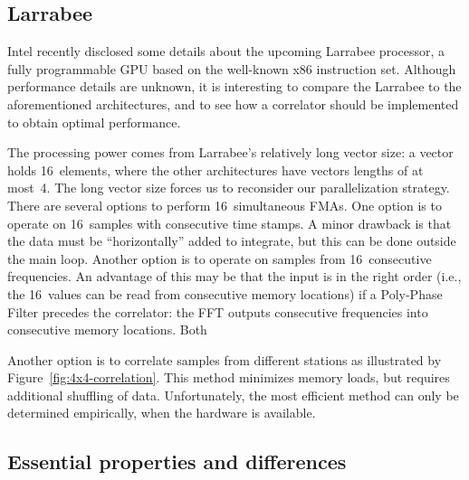 \documentclass{article}
\begin{document}
\subsection{Larrabee}

Intel recently disclosed some details about the upcoming Larrabee processor,
a fully programmable GPU based on the well-known x86 instruction set.
Although performance details are unknown, it is interesting to compare the
Larrabee to the aforementioned architectures, and to see how a correlator
should be implemented to obtain optimal performance.

The processing power comes from Larrabee's relatively long vector size:
a vector holds 16~elements, where the other architectures have vectors lengths
of at most~4.
The long vector size forces us to reconsider our parallelization strategy.
There are several options to perform 16~simultaneous FMAs.
One option is to operate on 16~samples with consecutive time stamps.
A minor drawback is that the data must be ``horizontally'' added to integrate,
but this can be done outside the main loop.
Another option is to operate on samples from 16~consecutive frequencies.
An advantage of this may be that the input is in the right order (i.e.,
the 16~values can be read from consecutive memory locations) if a Poly-Phase
Filter precedes the correlator: the FFT outputs consecutive frequencies into
consecutive memory locations.
Both 

Another option is to correlate samples from different stations as illustrated
by Figure~\ref{fig:4x4-correlation}.
This method minimizes memory loads, but requires additional shuffling of data.
Unfortunately, the most efficient method can only be determined empirically,
when the hardware is available.


\subsection{Essential properties and differences}
\end{document}
